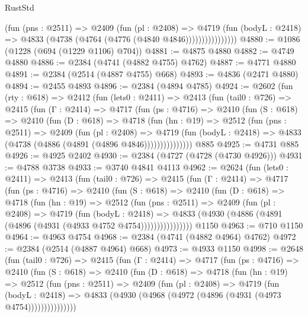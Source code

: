 \begin{lexlean}{RustStd}
\begin{coremodule}
                      (fun (pns : @2511) =>
                      @2409
                        (fun (pl : @2408) =>
                        @4719
                          (fun (bodyL : @2418) =>
                          @4833 (@4738 (@4764 (@4776 (@4840 @4846))))))))))))))))
@4880 := @1086 (@1228 (@694 (@1229 @1106) @704))
@4881 := @4875 @4880
@4882 := @4749 @4880
@4886 := @2384 (@4741 (@4882 @4755) @4762)
@4887 := @4771 @4880
@4891 := @2384 (@2514 (@4887 @4755) @668)
@4893 := @4836 (@2471 @4880)
@4894 := @2455 @4893
@4896 := @2384 (@4894 @4785)
@4924 := @2602
    (fun (rty : @618) =>
    @2412
      (fun (lets0 : @2411) =>
      @2413
        (fun (tail0 : @726) =>
        @2415
          (fun (Γ : @2414) =>
          @4717
            (fun (ps : @4716) =>
            @2410
              (fun (S : @618) =>
              @2410
                (fun (D : @618) =>
                @4718
                  (fun (hn : @19) =>
                  @2512
                    (fun (pns : @2511) =>
                    @2409
                      (fun (pl : @2408) =>
                      @4719
                        (fun (bodyL : @2418) =>
                        @4833 (@4738 (@4886 (@4891 (@4896 @4846)))))))))))))))
    @885
@4925 := @4731 @885
@4926 := @4925 @2402
@4930 := @2384 (@4727 (@4728 (@4730 @4926)))
@4931 := @4788 @3738
@4933 := @3740 @4841 @4113
@4962 := @2624
    (fun (lets0 : @2411) =>
    @2413
      (fun (tail0 : @726) =>
      @2415
        (fun (Γ : @2414) =>
        @4717
          (fun (ps : @4716) =>
          @2410
            (fun (S : @618) =>
            @2410
              (fun (D : @618) =>
              @4718
                (fun (hn : @19) =>
                @2512
                  (fun (pns : @2511) =>
                  @2409
                    (fun (pl : @2408) =>
                    @4719
                      (fun (bodyL : @2418) =>
                      @4833 (@4930 (@4886 (@4891 (@4896 (@4931 (@4933 @4752 @4754))))))))))))))))
    @1150
@4963 := @710 @1150
@4964 := @4963 @4754
@4968 := @2384 (@4741 (@4882 @4964) @4762)
@4972 := @2384 (@2514 (@4887 @4964) @668)
@4973 := @4933 @1150
@4998 := @2648
    (fun (tail0 : @726) =>
    @2415
      (fun (Γ : @2414) =>
      @4717
        (fun (ps : @4716) =>
        @2410
          (fun (S : @618) =>
          @2410
            (fun (D : @618) =>
            @4718
              (fun (hn : @19) =>
              @2512
                (fun (pns : @2511) =>
                @2409
                  (fun (pl : @2408) =>
                  @4719
                    (fun (bodyL : @2418) =>
                    @4833 (@4930 (@4968 (@4972 (@4896 (@4931 (@4973 @4754)))))))))))))))

\end{coremodule}
\end{lexlean}
